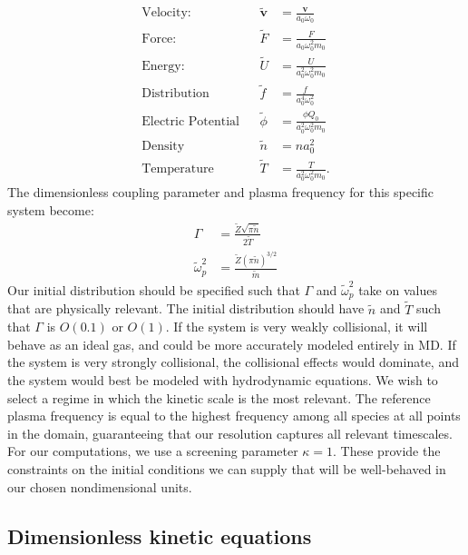 \documentclass{article}
\begin{document}
\begin{align*}
\text{Velocity:}&			&	\tilde{\mathbf{v}} 	 &= \frac{\mathbf{v}}{a_0\omega_0} 				\\
\text{Force:}&				&	\tilde{F} 	 &= \frac{F}{a_0\omega_0^2m_0}			\\
\text{Energy:}&				&	\tilde{U} 	 &= \frac{U}{a_0^2\omega_0^2m_0} 		\\
\text{Distribution}& 		&	\tilde{f} 	 &= \frac{f}{a_0^4\omega_0^2}			\\
\text{Electric Potential}&	&	\tilde{\phi} &= \frac{\phi Q_0}{a_0^2\omega_0^2m_0}	\\
\text{Density}&				&	\tilde{n}	 &= na_0^2								\\
\text{Temperature}&			&	\tilde{T}	 &=	\frac{T}{a_0^2\omega_0^2m_0}.		
\end{align*}The dimensionless coupling parameter and plasma frequency for this specific system become:
\begin{align}
\Gamma&=\frac{\tilde{Z}\sqrt{\pi\tilde{n}}}{2\tilde{T}}\\
\tilde{\omega}_p^2&=\frac{\tilde{Z}(\pi\tilde{n})^{3/2}}{\tilde{m}}
\end{align}Our initial distribution should be specified such that $\Gamma$ and $\tilde{\omega}_p^2$ take on values that are physically relevant. The initial distribution should have $\tilde{n}$ and $\tilde{T}$ such that $\Gamma$ is $O(0.1)$ or $O(1)$. If the system is very weakly collisional, it will behave as an ideal gas, and could be more accurately modeled entirely in MD. If the system is very strongly collisional, the collisional effects would dominate, and the system would best be modeled with hydrodynamic equations. We wish to select a regime in which the kinetic scale is the most relevant. The reference plasma frequency is equal to the highest frequency among all species at all points in the domain, guaranteeing that our resolution captures all relevant timescales. For our computations, we use a screening parameter $\kappa=1$. These provide the constraints on the initial conditions we can supply that will be well-behaved in our chosen nondimensional units.
\subsection{Dimensionless kinetic equations}
\end{document}
